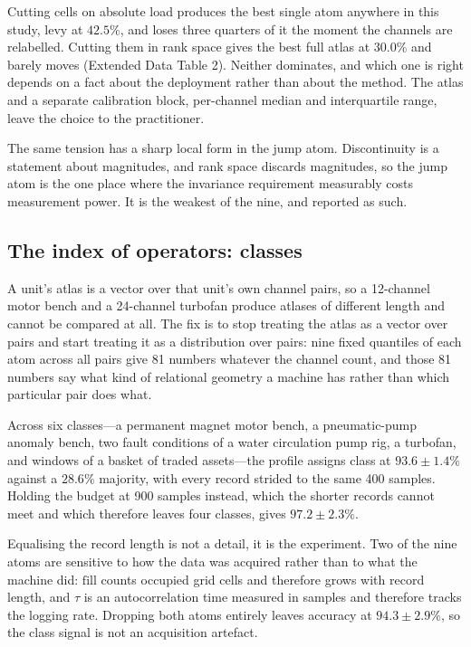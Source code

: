\documentclass[11pt]{article}
\newcommand{\levy}{\mathrm{levy}}
\begin{document}
Cutting cells on absolute load produces the best single atom anywhere in this
study, $\levy$ at $42.5\%$, and loses three quarters of it the moment the
channels are relabelled. Cutting them in rank space gives the best full atlas
at $30.0\%$ and barely moves (Extended Data Table 2). Neither dominates, and
which one is right depends on a fact about the deployment rather than about
the method. The atlas and a separate calibration block, per-channel median
and interquartile range, leave the choice to the practitioner.

The same tension has a sharp local form in the jump atom. Discontinuity is a
statement about magnitudes, and rank space discards magnitudes, so the jump
atom is the one place where the invariance requirement measurably costs
measurement power. It is the weakest of the nine, and reported as such.

\subsection{The index of operators: classes}


A unit's atlas is a vector over that unit's own channel pairs, so a 12-channel
motor bench and a 24-channel turbofan produce atlases of different length and
cannot be compared at all. The fix is to stop treating the atlas as a vector
over pairs and start treating it as a distribution over pairs: nine fixed
quantiles of each atom across all pairs give 81 numbers whatever the channel
count, and those 81 numbers say what kind of relational geometry a machine has
rather than which particular pair does what.

Across six classes---a permanent magnet motor bench, a pneumatic-pump anomaly bench,
two fault conditions of a water circulation pump rig, a turbofan, and windows
of a basket of traded assets---the profile assigns class at
$93.6\pm1.4\%$ against a $28.6\%$ majority, with every record strided to the
same 400 samples. Holding the budget at 900 samples instead, which the shorter
records cannot meet and which therefore leaves four classes, gives
$97.2\pm2.3\%$.

Equalising the record length is not a detail, it is the experiment. Two of the
nine atoms are sensitive to how the data was acquired rather than to what the
machine did: $\mathrm{fill}$ counts occupied grid cells and therefore grows
with record length, and $\tau$ is an autocorrelation time measured in samples
and therefore tracks the logging rate. Dropping both atoms entirely leaves
accuracy at $94.3\pm2.9\%$, so the class signal is not an acquisition artefact.
\end{document}
